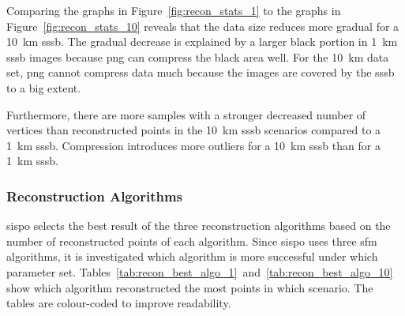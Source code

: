 Comparing the graphs in Figure~\ref{fig:recon_stats_1} to the graphs in Figure~\ref{fig:recon_stats_10} reveals that the data size reduces more gradual for a \SI{10}{\kilo\meter} \gls{sssb}. The gradual decrease is explained by a larger black portion in \SI{1}{\kilo\meter} \gls{sssb} images because \gls{png} can compress the black area well. For the \SI{10}{\kilo\meter} data set, \gls{png} cannot compress data much because the images are covered by the \gls{sssb} to a big extent.

Furthermore, there are more samples with a stronger decreased number of vertices than reconstructed points in the \SI{10}{\kilo\meter} \gls{sssb} scenarios compared to a \SI{1}{\kilo\meter} \gls{sssb}. Compression introduces more outliers for a \SI{10}{\kilo\meter} \gls{sssb} than for a \SI{1}{\kilo\meter} \gls{sssb}.

\subsubsection{Reconstruction Algorithms}
\gls{sispo} selects the best result of the three reconstruction algorithms based on the number of reconstructed points of each algorithm. Since \gls{sispo} uses three \gls{sfm} algorithms, it is investigated which algorithm is more successful under which parameter set. Tables~\ref{tab:recon_best_algo_1}~and~\ref{tab:recon_best_algo_10} show which algorithm reconstructed the most points in which scenario. The tables are colour-coded to improve readability.

\begin{table}[htb]
    \centering
    \caption{\Gls{sfm} algorithm with most reconstructed points for each scenario with a \SI{1}{\kilo\meter} \gls{sssb}. Seq1 refers to algorithm IncrementalSfM and Seq2 refers to algorithm IncrementalSfM2.}
    \label{tab:recon_best_algo_1}
\end{table}

